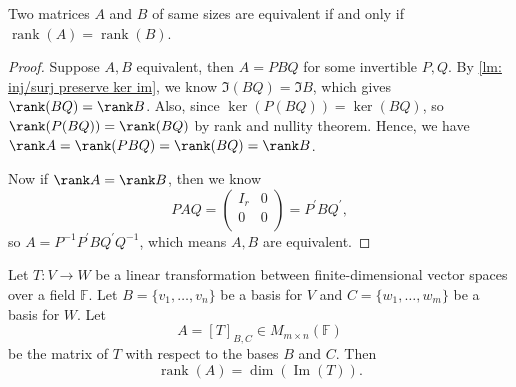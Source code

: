 \begin{theorem}
Two matrices $A$ and $B$ of same sizes are equivalent if and only if $\operatorname{rank}(A) = \operatorname{rank}(B)$.
\end{theorem}
\begin{proof}
    Suppose \(A, B\) equivalent, then \(A = PBQ\) for some invertible \(P, Q\). By \autoref{lm: inj/surj preserve ker im}, we know \(\Im (BQ) = \Im B\), which gives \(\rank (BQ) = \rank B\). Also, since \(\ker (P (BQ)) = \ker (BQ)\), so \(\rank (P(BQ)) = \rank (BQ)\) by rank and nullity theorem. Hence, we have \(\rank A = \rank (PBQ) = \rank (BQ) = \rank B\).
    
    Now if \(\rank A = \rank B\), then we know 
    \[
        PAQ = \begin{pmatrix}
            I_r &  0 \\
            0 &  0 \\
        \end{pmatrix} = P^{\prime} B Q^{\prime}, 
    \] so \(A = P^{-1} P^{\prime} B Q^{\prime} Q^{-1}  \), which means \(A, B\) are equivalent.  
\end{proof}

\begin{theorem}
Let $T: V \to W$ be a linear transformation between finite-dimensional vector spaces over a field $\mathbb{F}$. Let $B = \{v_1, \dots, v_n\}$ be a basis for $V$ and $C = \{w_1, \dots, w_m\}$ be a basis for $W$. Let 
\[
A = [T]_{B,C} \in M_{m \times n}(\mathbb{F})
\] 
be the matrix of $T$ with respect to the bases $B$ and $C$. Then
\[
\operatorname{rank}(A) = \dim(\operatorname{Im}(T)).
\]
\end{theorem}

